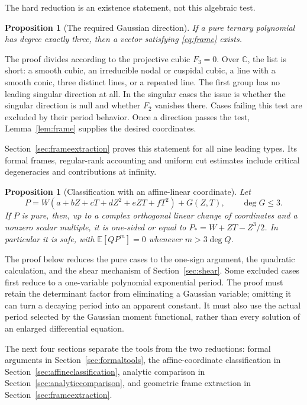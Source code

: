 \documentclass[11pt]{article}
\newtheorem{proposition}[theorem]{Proposition}
\theoremstyle{definition}\newtheorem{definition}[theorem]{Definition}
\theoremstyle{remark}\newtheorem{remark}[theorem]{Remark}
\newcommand{\E}{\mathbb E}
\newcommand{\C}{\mathbb C}
\begin{document}
The hard reduction is an existence statement, not this algebraic test.

\begin{proposition}[The required Gaussian direction]\label{prop:frameextract}
If a pure ternary polynomial has degree exactly three, then a vector satisfying
\eqref{eq:frame} exists.
\end{proposition}

The proof divides according to the projective cubic $F_3=0$.
Over $\C$, the list is short: a smooth cubic, an irreducible nodal or
cuspidal cubic, a line with a smooth conic, three distinct lines, or a
repeated line. The first group has no leading singular direction at
all. In the singular cases the issue is whether the singular direction
is null and whether $F_2$ vanishes there. Cases failing this test are
excluded by their period behavior. Once a direction passes the test,
Lemma~\ref{lem:frame} supplies the desired coordinates.

Section~\ref{sec:frameextraction} proves this statement for all nine
leading types. Its formal frames, regular-rank accounting and uniform
cut estimates include critical degeneracies and contributions at infinity.

\begin{proposition}[Classification with an affine-linear coordinate]\label{prop:wlinear}
Let
\[
 P=W(a+bZ+cT+dZ^2+eZT+fT^2)+G(Z,T),\qquad\deg G\leq3.
\]
If $P$ is pure, then, up to a complex orthogonal linear change of
coordinates and a nonzero scalar multiple, it is one-sided or equal to
$P_*=W+ZT-Z^3/2$. In particular it is safe, with
$\E[QP^m]=0$ whenever $m>3\deg Q$.
\end{proposition}

The proof below reduces the pure cases to the one-sign argument,
the quadratic calculation, and the shear mechanism of
Section~\ref{sec:shear}. Some excluded cases first reduce to a
one-variable polynomial exponential period. The proof must retain
the determinant factor from eliminating a Gaussian variable; omitting
it can turn a decaying period into an apparent constant. It must also
use the actual period selected by the Gaussian moment functional,
rather than every solution of an enlarged differential equation.

The next four sections separate the tools from the two reductions:
formal arguments in Section~\ref{sec:formaltools}, the affine-coordinate
classification in Section~\ref{sec:affineclassification}, analytic
comparison in Section~\ref{sec:analyticcomparison}, and geometric frame
extraction in Section~\ref{sec:frameextraction}.
\end{document}
